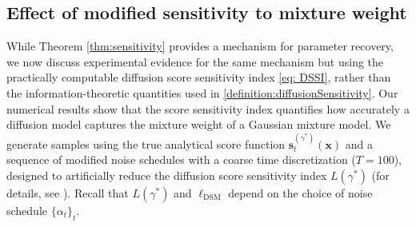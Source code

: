 \documentclass[11pt]{article}
\newcommand{\vect}[1]{\mathbf{#1}}
\theoremstyle{plain}
\newcommand{\1}{\mathbbm{1}}
\newcommand{\ldsm}{\ell_\mathrm{DSM}}
\newcommand{\score}[2][]{\vect{s}_{#1}^{(#2)}}
\begin{document}




\subsection{Effect of modified sensitivity to mixture weight}\label{sec: GMM Sens Exp}

While Theorem \ref{thm:sensitivity} provides a mechanism for parameter recovery, we now discuss experimental evidence for the same mechanism but using the practically computable diffusion score sensitivity index \eqref{eq: DSSI}, rather than the information-theoretic quantities used in \cref{definition:diffusionSensitivity}. Our numerical results show that the score sensitivity index quantifies how accurately a diffusion model captures the mixture weight of a Gaussian mixture model. We generate samples using the true analytical score function $\score[t]{\gamma^*}(\vect x)$ and a sequence of modified noise schedules with a coarse time discretization ($T=100$), designed to artificially reduce the diffusion score sensitivity index $L(\gamma^*)$ (for details, see ). Recall that $L(\gamma^*)$ and $\ldsm$ depend on the choice of noise schedule $\{\alpha_t\}_t$. %
\end{document}
